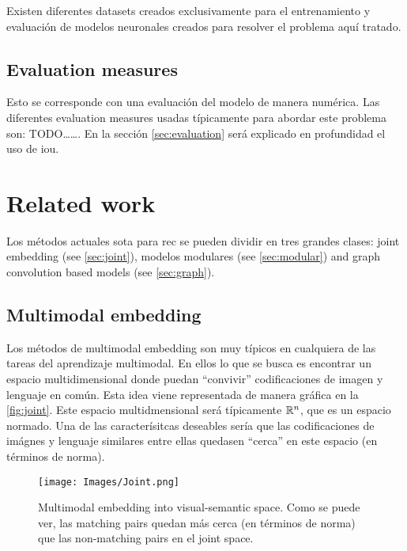 Existen diferentes datasets creados exclusivamente para el entrenamiento y
evaluación de modelos neuronales creados para resolver el problema aquí
tratado.


\subsection{Evaluation measures} \label{sec:eval-measure}

Esto se corresponde con una evaluación del modelo de manera numérica. Las
diferentes evaluation measures usadas típicamente para abordar este problema
son: TODO\ldots\ldots. En la sección \vref{sec:evaluation} será explicado en
profundidad el uso de \gls{iou}.


\section{Related work}

Los métodos actuales \gls{sota} para \gls{rec} se pueden dividir en tres
grandes clases: joint embedding (see \vref{sec:joint}), modelos modulares (see
\vref{sec:modular}) and graph convolution based models (see
\vref{sec:graph}).

\subsection{Multimodal embedding} \label{sec:joint} Los métodos de multimodal
embedding son muy típicos en cualquiera de las tareas del aprendizaje
multimodal. En ellos lo que se busca es encontrar un espacio multidimensional
donde puedan ``convivir'' codificaciones de imagen y lenguaje en común. Esta
idea viene representada de manera gráfica en la \vref{fig:joint}. Este espacio
multidmensional será típicamente \(\mathbb{R}^n\), que es un espacio normado. Una de
las caracterísitcas deseables sería que las codificaciones de imágnes y
lenguaje similares entre ellas quedasen ``cerca'' en este espacio (en términos
de norma).

\begin{figure}[ht]
  \centering
  \texttt{[image: Images/Joint.png]}
  \caption[Multimodal embedding technique]{Multimodal embedding into
    visual-semantic space. Como se puede ver, las matching pairs quedan más
    cerca (en términos de norma) que las non-matching pairs en el joint space.}
  \label{fig:joint}
\end{figure}

